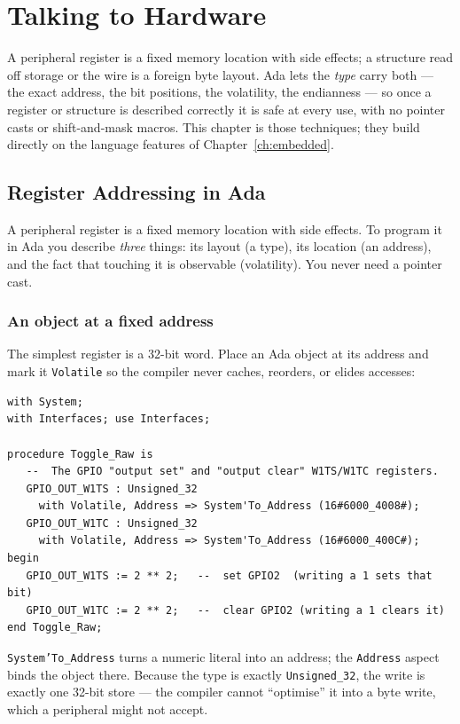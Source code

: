 \chapter{Talking to Hardware}
\label{ch:hardware}

A peripheral register is a fixed memory location with side effects; a structure
read off storage or the wire is a foreign byte layout. Ada lets the \emph{type}
carry both --- the exact address, the bit positions, the volatility, the
endianness --- so once a register or structure is described correctly it is safe at
every use, with no pointer casts or shift-and-mask macros. This chapter is those
techniques; they build directly on the language features of
Chapter~\ref{ch:embedded}.

\section{Register Addressing in Ada}
\label{ch:registers}

A peripheral register is a fixed memory location with side effects. To program it
in Ada you describe \emph{three} things: its layout (a type), its location (an
address), and the fact that touching it is observable (volatility). You never
need a pointer cast.

\subsection{An object at a fixed address}

The simplest register is a 32-bit word. Place an Ada object at its address and
mark it \texttt{Volatile} so the compiler never caches, reorders, or elides
accesses:

\begin{lstlisting}
with System;
with Interfaces; use Interfaces;

procedure Toggle_Raw is
   --  The GPIO "output set" and "output clear" W1TS/W1TC registers.
   GPIO_OUT_W1TS : Unsigned_32
     with Volatile, Address => System'To_Address (16#6000_4008#);
   GPIO_OUT_W1TC : Unsigned_32
     with Volatile, Address => System'To_Address (16#6000_400C#);
begin
   GPIO_OUT_W1TS := 2 ** 2;   --  set GPIO2  (writing a 1 sets that bit)
   GPIO_OUT_W1TC := 2 ** 2;   --  clear GPIO2 (writing a 1 clears it)
end Toggle_Raw;
\end{lstlisting}

\texttt{System'To\_Address} turns a numeric literal into an address; the
\texttt{Address} aspect binds the object there. Because the type is exactly
\texttt{Unsigned\_32}, the write is exactly one 32-bit store --- the compiler
cannot ``optimise'' it into a byte write, which a peripheral might not accept.

